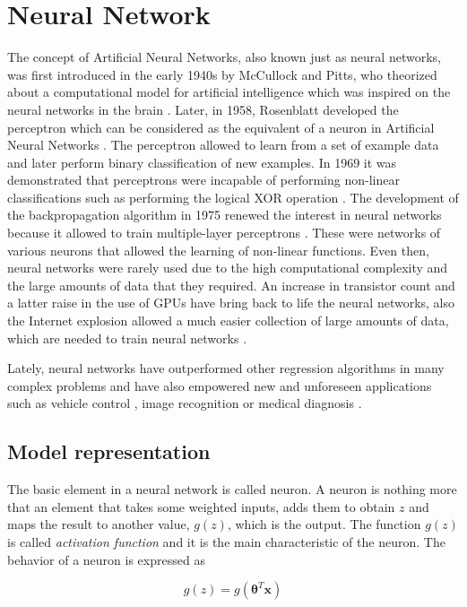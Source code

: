 \documentclass[a4paper, report, oneside, UKenglish]{memoir}
\newcommand{\btheta}{\boldsymbol{\theta}}
\begin{document}
\section{Neural Network}
The concept of Artificial Neural Networks, also known just as neural networks, was first introduced in the early 1940s by McCullock and Pitts, who theorized about a computational model for artificial intelligence which was inspired on the neural networks in the brain \cite{mcculloch_logical_1943}. Later, in 1958, Rosenblatt developed the perceptron which can be considered as the equivalent of a neuron in Artificial Neural Networks \cite{rosenblatt_perceptron_1958}. The perceptron allowed to learn from a set of example data and later perform binary classification of new examples. In 1969 it was demonstrated that perceptrons were incapable of performing non-linear classifications such as performing the logical XOR operation \cite{minsky69perceptrons}. The development of the backpropagation algorithm in 1975 renewed the interest in neural networks because it allowed to train multiple-layer perceptrons \cite{werbos}. These were networks of various neurons that allowed the learning of non-linear functions. Even then, neural networks were rarely used due to the high computational complexity and the large amounts of data that they required. An increase in transistor count and a latter raise in the use of GPUs have bring back to life the neural networks, also the Internet explosion allowed a much easier collection of large amounts of data, which are needed to train neural networks \cite{aggarwal_neural_2018}.

Lately, neural networks have outperformed other regression algorithms in many complex problems and have also empowered new and unforeseen applications such as vehicle control \cite{BojarskiTDFFGJM16}, image recognition \cite{hijazi2015} or medical diagnosis \cite{AMATO201347}.

\subsection{Model representation}
The basic element in a neural network is called neuron. A neuron is nothing more that an element that takes some weighted inputs, adds them to obtain $z$ and maps the result to another value, $g(z)$, which is the output. The function $g(z)$ is called \textit{activation function} and it is the main characteristic of the neuron. The behavior of a neuron is expressed as

\begin{equation}
    g(z) = g(\btheta^T\boldsymbol{x})
\end{equation}
\end{document}

